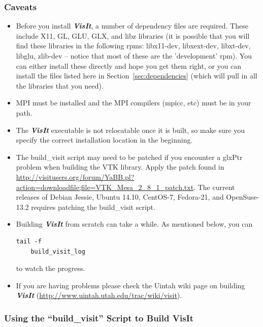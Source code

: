 \documentclass[12pt]{article}
\begin{document}
\subsubsection{Caveats}
\label{subsec:VisIt_Caveats}
\begin{itemize}
\item Before you install \textbf{\emph{VisIt}}, a number of dependency
  files are required.  These include X11, GL, GLU, GLX, and libz
  libraries (it is possible that you will find these libraries in the
  following rpms: libx11-dev, libxext-dev, libxt-dev, libglu, zlib-dev
  -- notice that most of these are the 'development' rpm).  You can
  either install these directly and hope you get them right, or you
  can install the files listed here in Section~\ref{sec:dependencies}
  (which will pull in all the libraries that you need).
\item MPI must be installed and the MPI compilers (mpicc, etc) must be
  in your path.
\item The \textbf{\emph{VisIt}} executable is not relocatable once it
  is built, so make sure you specify the correct installation location
  in the beginning.
\item The build\_visit script may need to be patched if you encounter
  a glxPtr problem when building the VTK library.  Apply the patch
  found in
  \url{http://visitusers.org/forum/YaBB.pl?action=downloadfile;file=VTK_Mesa_2_8_1_patch.txt}.
  The current releases of Debian Jessie, Ubuntu 14.10, CentOS-7,
  Fedora-21, and OpenSuse-13.2 requires patching the build\_visit
  script.
\item Building \textbf{\emph{VisIt}} from scratch can take a while.
  As mentioned below, you can \begin{verbatim}tail -f
    build_visit_log\end{verbatim} to watch the progress.
\item If you are having problems please check the Uintah wiki page on
  building \textbf{\emph{VisIt}}
  (\url{http://www.uintah.utah.edu/trac/wiki/visit}).

\end{itemize}



\subsubsection{Using the ``build\_visit'' Script to Build VisIt}
\label{subsec:VisItVersion2_tarball}
\end{document}
